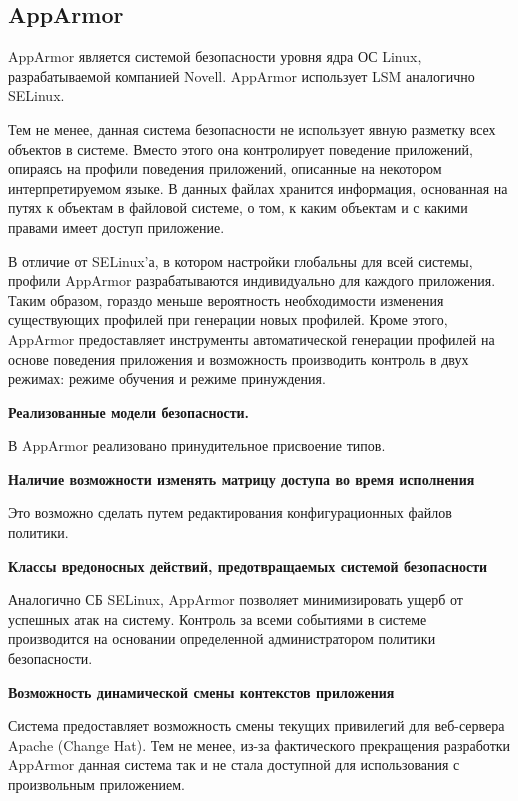 \subsection{AppArmor}

AppArmor является системой безопасности уровня 
ядра ОС Linux, разрабатываемой компанией Novell. 
AppArmor использует LSM аналогично SELinux. 

Тем не менее, данная система безопасности не использует
явную разметку всех объектов в системе.
Вместо этого она контролирует поведение 
приложений, опираясь на профили поведения
приложений, описанные на некотором интерпретируемом
языке. 
В данных файлах хранится информация, основанная на 
путях к объектам в файловой системе, о том, к каким 
объектам и с какими правами имеет доступ приложение. 

В отличие от SELinux'а, 
в котором настройки глобальны для всей системы, профили 
AppArmor разрабатываются индивидуально для каждого 
приложения.
Таким образом, гораздо меньше вероятность 
необходимости изменения существующих профилей при 
генерации новых профилей. Кроме этого, 
AppArmor предоставляет инструменты 
автоматической генерации профилей на основе поведения 
приложения и возможность производить контроль в двух 
режимах: режиме обучения и режиме принуждения. 

\bigskip
{\bfseries Реализованные модели безопасности.} 

В AppArmor реализовано принудительное присвоение типов. 

\bigskip
{\bfseries Наличие возможности изменять матрицу доступа 
	во время исполнения} 

Это возможно сделать путем редактирования конфигурационных
файлов политики. 

\bigskip
{\bfseries Классы вредоносных действий, предотвращаемых
	системой безопасности} 

Аналогично СБ SELinux, AppArmor позволяет 
минимизировать ущерб от успешных атак на систему. 
Контроль за всеми событиями в системе производится 
на основании определенной администратором политики 
безопасности. 

\bigskip
{\bfseries Возможность динамической смены 
контекстов приложения} 

Система предоставляет возможность смены
текущих привилегий для веб-сервера Apache
(Change Hat). Тем не менее, из-за фактического
прекращения разработки AppArmor данная 
система так и не стала доступной для использования
с произвольным приложением. 


